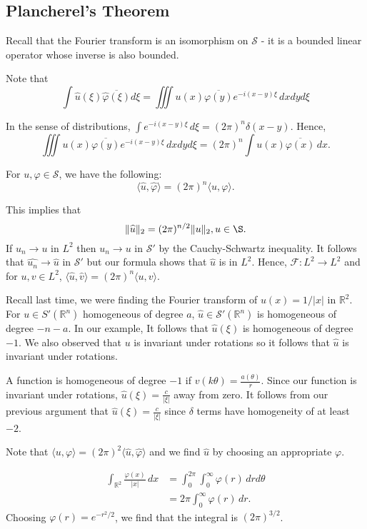 \documentclass[12pt]{scrartcl}
\newcommand{\R}{\mathbb{R}}
\renewcommand{\hat}{\widehat}
\newcommand{\<}{\langle}
\renewcommand{\>}{\rangle}
\let \phi \varphi
\let \mc \mathcal
\let \ov \overline
\begin{document}
\subsection{Plancherel's Theorem}
Recall that the Fourier transform is an isomorphism on $\mc S$ - it is a bounded linear operator whose inverse is also bounded.  

Note that 
$$\int \hat{u}(\xi) \ov{\hat{\phi}(\xi)}d\xi = \iiint u(x)\ov{\phi(y)} e^{-i(x-y)\xi}\,dxdyd\xi$$

In the sense of distributions, $\int e^{-i(x-y)\xi}\,d\xi = (2\pi)^n \delta(x-y).$
Hence,
$$\iiint u(x)\ov{\phi(y)} e^{-i(x-y)\xi}\,dxdyd\xi = (2\pi)^n \int u(x)\ov{\phi(x)}\,dx.$$

For $u, \phi \in \mc S$, we have the following: $$\< \hat{u}, \hat{\phi}\> = (2\pi)^n \< u, \phi \>.$$

This implies that 
$$\|\hat{u}\|_2 = (2\pi)^{n/2} \|u\|_{2}, u \in \S.$$
If $u_n \to u$ in $L^2$ then $u_n \to u$ in $\mc S'$ by the Cauchy-Schwartz inequality.  It follows that $\hat{u_n} \to \hat{u}$ in $\mc S'$ but our formula shows that $\hat{u}$ is in $L^2$.  Hence, $\mc F: L^2 \to L^2$ and for $u, v \in L^2$, $\<\hat{u}, \hat{v} \> = (2\pi)^n \<u, v\>$.

Recall last time, we were finding the Fourier transform of $u(x) = 1/|x|$ in $\R^2$.    For $u \in S'(\R^n)$ homogeneous of degree $a$, $\hat{u} \in \mc S'(\R^n)$ is homogeneous of degree $-n-a$.  In our example, It follows that $\hat{u}(\xi)$ is homogeneous of degree $-1$.  We also observed that $u$ is invariant under rotations so it follows that $\hat{u}$ is invariant under rotations.  

A function is homogeneous of degree $-1$ if $v(k\theta) = \frac{a(\theta)}{r}.$  Since our function is invariant under rotations, $\hat{u}(\xi) = \frac{c}{|\xi|}$ away from zero.  It follows from our previous argument that $\hat{u}(\xi) = \frac{c}{|\xi|}$ since $\delta$ terms have homogeneity of at least $-2$.  

Note that $\<u, \phi\> = (2\pi)^2 \<\hat{u}, \hat{\phi}\>$ and we find $\hat{u}$ by choosing an appropriate $\phi$.

\begin{align*}
\int_{\R^2} \frac{\phi(x)}{|x|}\,dx &= \int_0^{2\pi} \int_{0}^\infty \phi(r) \, drd\theta \\
&= 2\pi \int_{0}^\infty \phi(r)\,dr.
\end{align*}
Choosing $\phi(r) = e^{-r^2/2}$, we find that the integral is $(2\pi)^{3/2}$.  
\end{document}
